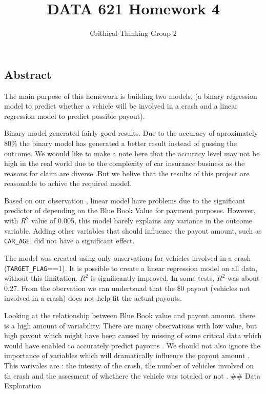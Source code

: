 \documentclass[]{article}
\title{DATA 621 Homework 4}
\author{Crithical Thinking Group 2}
\date{}
\begin{document}
\maketitle

\subsection{Abstract}\label{abstract}

The main purpose of this homework is building two models, (a binary
regression model to predict whether a vehicle will be involved in a
crash and a linear regression model to predict possible payout).

Binary model generated fairly good results. Due to the accuracy of
aproximately 80\% the binary model has generated a better result instead
of gussing the outcome. We woould like to make a note here that the
accuracy level may not be high in the real world due to the complexity
of car insurance business as the reasons for claim are diverse .But we
belive that the results of this project are reasonable to achive the
required model.

Based on our observation , linear model have problems due to the
significant predictor of depending on the Blue Book Value for payment
purposes. However, with \(R^2\) value of 0.005, this model barely
explains any variance in the outcome variable. Adding other variables
that should influence the payout amount, such as \texttt{CAR\_AGE}, did
not have a significant effect.

The model was created using only onservations for vehicles involved in a
crash (\texttt{TARGET\_FLAG}==1). It is possible to create a linear
regression model on all data, without this limitation. \(R^2\) is
significantly improved. In some tests, \(R^2\) was about 0.27. From the
obervation we can undertsnad that the \$0 payout (vehicles not involved
in a crash) does not help fit the actual payouts.

Looking at the relationship between Blue Book value and payout amount,
there is a high amount of variability. There are many observations with
low value, but high payout which might have been caused by missing of
some critical data which would have enabled to accurately predict
payouts . We should not also ignore the importance of variables which
will dramatically influence the payout amount . This varivales are : the
intesity of the crash, the number of vehicles involved on th crash and
the assesment of whethere the vehicle was totaled or not . \#\# Data
Exploration
\end{document}
